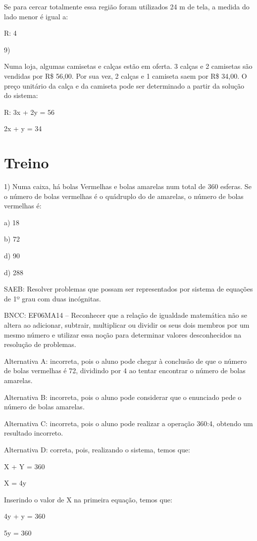 Se para cercar totalmente essa região foram utilizados 24 m de tela, a
medida do lado menor é igual a:

R: 4

9)

Numa loja, algumas camisetas e calças estão em oferta. 3 calças e 2
camisetas são vendidas por R\$ 56,00. Por sua vez, 2 calças e 1 camiseta
saem por R\$ 34,00. O preço unitário da calça e da camiseta pode ser
determinado a partir da solução do sistema:

R: 3x + 2y = 56

2x + y = 34

\section{Treino}

1) Numa caixa, há bolas Vermelhas e bolas amarelas num total de 360
esferas. Se o número de bolas vermelhas é o quádruplo do de amarelas, o
número de bolas vermelhas é:

a) 18

b) 72

d) 90

d) 288

SAEB: Resolver problemas que possam ser representados por sistema de
equações de 1º grau com duas incógnitas.

BNCC: EF06MA14 -- Reconhecer que a relação de igualdade matemática não
se altera ao adicionar, subtrair, multiplicar ou dividir os seus dois
membros por um mesmo número e utilizar essa noção para determinar
valores desconhecidos na resolução de problemas.

Alternativa A: incorreta, pois o aluno pode chegar à conclusão de que o
número de bolas vermelhas é 72, dividindo por 4 ao tentar encontrar o
número de bolas amarelas.

Alternativa B: incorreta, pois o aluno pode considerar que o enunciado
pede o número de bolas amarelas.

Alternativa C: incorreta, pois o aluno pode realizar a operação 360:4,
obtendo um resultado incorreto.

Alternativa D: correta, pois, realizando o sistema, temos que:

X + Y = 360

X = 4y

Inserindo o valor de X na primeira equação, temos que:

4y + y = 360

5y = 360

